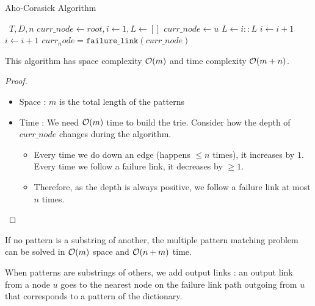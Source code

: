 \documentclass{cours}
\begin{document}
\begin{algorithm}
    \caption{Aho-Corasick Algorithm}
    \begin{algorithmic}
        \Input \ $T, D, n$
        \EndInput
        \State $curr\_node \gets root, i \gets 1, L \gets []$
        \State $curr\_node \gets u$
        \State $L \gets i :: L$
        \EndIf
        \State $i \gets i + 1$
        \Else
        \State $i \gets i + 1$
        \Else
        \State $curr_node = \texttt{failure\_link}(curr\_node)$
        \EndIf
        \EndIf
        \EndWhile
    \end{algorithmic}
\end{algorithm}

\begin{proposition}
    This algorithm has space complexity $\mathcal{O}(m)$ and time complexity $\mathcal{O}(m + n)$.
\end{proposition}
\begin{proof}
    \begin{itemize}
        \item Space : $m$ is the total length of the patterns
        \item Time : We need $\mathcal{O}(m)$ time to build the trie. Consider how the depth of $curr\_node$ changes during the algorithm.
              \begin{itemize}
                  \item Every time we do down an edge (happens $\leq n$ times), it increases by $1$. Every time we follow a failure link, it decreases by $\geq 1$.
                  \item Therefore, as the depth is always positive, we follow a failure link at most $n$ times.
              \end{itemize}
    \end{itemize}
\end{proof}

\begin{theorem}
    If no pattern is a substring of another, the multiple pattern matching problem can be solved in $\mathcal{O}(m)$ space and $\mathcal{O}(n + m)$ time.
\end{theorem}

\begin{definition}
    When patterns are substrings of others, we add output links : an output link from a node $u$ goes to the nearest node on the failure link path outgoing from $u$ that corresponds to a pattern of the dictionary.
\end{definition}
\end{document}
